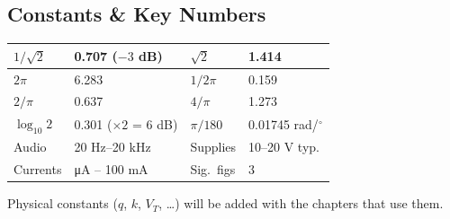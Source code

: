     \subsection[1.C]{Constants \& Key Numbers}
    \begin{tabularx}{\linewidth}{|l|L||l|L|}
        \hline
        $1/\sqrt2$ & 0.707 ($-3$ dB) & $\sqrt2$ & 1.414 \\ \hline
        $2\pi$ & 6.283 & $1/2\pi$ & 0.159 \\ \hline
        $2/\pi$ & 0.637 & $4/\pi$ & 1.273 \\ \hline
        $\log_{10}2$ & 0.301 ($\times2$ = 6 dB) & $\pi/180$ & 0.01745 rad/$^\circ$ \\ \hline
        Audio & 20 Hz--20 kHz & Supplies & 10--20 V typ. \\ \hline
        Currents & \si{\micro\ampere} -- 100 mA & Sig.\ figs & 3 \\ \hline
    \end{tabularx}
    {\color{gray}Physical constants ($q$, $k$, $V_T$, \dots) will be added with the chapters that use them.}
